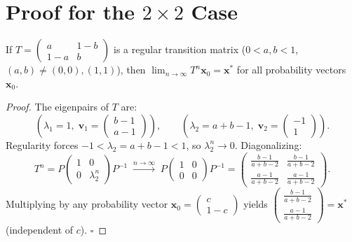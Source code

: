 \section{Proof for the $2\times2$ Case}

\begin{theorem}
If $T=\begin{pmatrix}a&1-b\\1-a&b\end{pmatrix}$ is a regular transition matrix ($0<a,b<1$, $(a,b)\neq(0,0),(1,1)$), then $\lim_{n\to\infty}T^n\mathbf{x}_0=\mathbf{x}^*$ for all probability vectors $\mathbf{x}_0$.
\end{theorem}

\begin{proof}
The eigenpairs of $T$ are:
\[
  \left(\lambda_1=1,\; \mathbf{v}_1=\begin{pmatrix}b-1\\a-1\end{pmatrix}\right), \qquad
  \left(\lambda_2=a+b-1,\; \mathbf{v}_2=\begin{pmatrix}-1\\1\end{pmatrix}\right).
\]
Regularity forces $-1<\lambda_2=a+b-1<1$, so $\lambda_2^n\to0$. Diagonalizing:
\[
T^n = P\begin{pmatrix}1&0\\0&\lambda_2^n\end{pmatrix}P^{-1} \;\xrightarrow{n\to\infty}\; P\begin{pmatrix}1&0\\0&0\end{pmatrix}P^{-1} = \begin{pmatrix}\frac{b-1}{a+b-2}&\frac{b-1}{a+b-2}\\\frac{a-1}{a+b-2}&\frac{a-1}{a+b-2}\end{pmatrix}.
\]
Multiplying by any probability vector $\mathbf{x}_0=\begin{pmatrix}c\\1-c\end{pmatrix}$ yields $\begin{pmatrix}\frac{b-1}{a+b-2}\\\frac{a-1}{a+b-2}\end{pmatrix}=\mathbf{x}^*$ (independent of $c$). $\square$
\end{proof}

